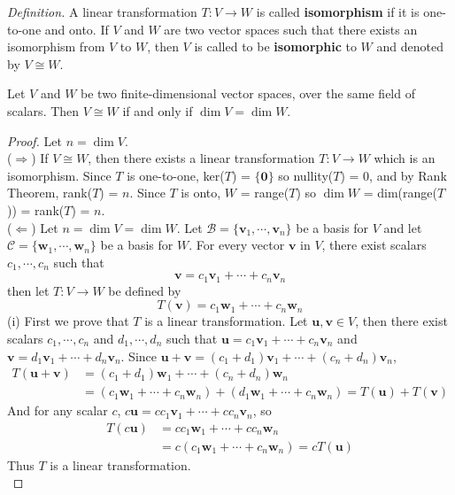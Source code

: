 \textit{Definition.} A linear transformation $T: V \rightarrow W$ is called \textbf{isomorphism} if it is one-to-one and onto. If $V$ and $W$ are two vector spaces such that there exists an isomorphism from $V$ to $W$, then $V$ is called to be \textbf{isomorphic} to $W$ and denoted by $V \cong W$.

\begin{theorem}
	Let $V$ and $W$ be two finite-dimensional vector spaces, over the same field of scalars. Then $V \cong W$ if and only if $\dim V = \dim W$.
\end{theorem}

\begin{proof}
	Let $n = \dim V$. \\
	
	($\Rightarrow$) If $V \cong W$, then there exists a linear transformation $T: V \rightarrow W$ which is an isomorphism. Since $T$ is one-to-one, ker($T$) = $\{\textbf{0}\}$ so nullity($T$) = 0, and by Rank Theorem, rank($T$) = $n$. Since $T$ is onto, $W$ = range($T$) so $\dim W$ = dim(range($T$)) = rank($T$) = $n$. \\
	
	($\Leftarrow$) Let $n = \dim V = \dim W$. Let $\mathcal{B} = \{\textbf{v}_1, \cdots, \textbf{v}_n\}$ be a basis for $V$ and let $\mathcal{C} = \{\textbf{w}_1, \cdots, \textbf{w}_n\}$ be a basis for $W$. For every vector $\textbf{v}$ in $V$, there exist scalars $c_1, \cdots, c_n$ such that \begin{equation*}
		\textbf{v} = c_1\textbf{v}_1 + \cdots + c_n\textbf{v}_n
	\end{equation*} then let $T: V \rightarrow W$ be defined by \begin{equation*}
		T(\textbf{v}) = c_1\textbf{w}_1 + \cdots + c_n\textbf{w}_n
	\end{equation*}
	(i) First we prove that $T$ is a linear transformation. Let $\textbf{u}, \textbf{v} \in V$, then there exist scalars $c_1, \cdots, c_n$ and $d_1, \cdots, d_n$ such that $\textbf{u} = c_1\textbf{v}_1 + \cdots + c_n\textbf{v}_n$ and $\textbf{v} = d_1\textbf{v}_1 + \cdots + d_n\textbf{v}_n$. Since $\textbf{u} + \textbf{v} = (c_1 + d_1)\textbf{v}_1 + \cdots + (c_n + d_n)\textbf{v}_n$, \begin{align*}
		T(\textbf{u} + \textbf{v}) &= (c_1 + d_1)\textbf{w}_1 + \cdots + (c_n + d_n)\textbf{w}_n \\ &= (c_1\textbf{w}_1 + \cdots + c_n\textbf{w}_n) + (d_1\textbf{w}_1 + \cdots + c_n\textbf{w}_n) = T(\textbf{u}) + T(\textbf{v})
	\end{align*} And for any scalar $c$, $c\textbf{u} = cc_1\textbf{v}_1 + \cdots + cc_n\textbf{v}_n$, so \begin{align*}
		T(c\textbf{u}) &= cc_1\textbf{w}_1 + \cdots + cc_n\textbf{w}_n \\
		&= c(c_1\textbf{w}_1 + \cdots + c_n\textbf{w}_n) = cT(\textbf{u})
	\end{align*} Thus $T$ is a linear transformation. \\
	

\end{proof}
